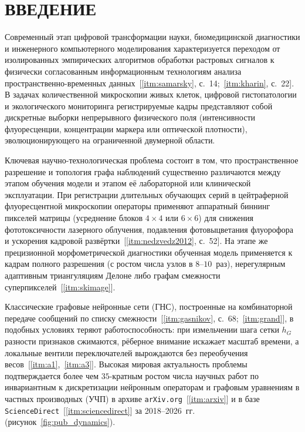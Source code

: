 
\chapter*{\large ВВЕДЕНИЕ}

Современный этап цифровой трансформации науки, биомедицинской диагностики и инженерного компьютерного моделирования характеризуется переходом от изолированных эмпирических алгоритмов обработки растровых сигналов к физически согласованным информационным технологиям анализа пространственно-временных данных~[\ref{itm:samarsky}, с.~14;~\ref{itm:kharin}, с.~22]. В задачах количественной микроскопии живых клеток, цифровой гистопатологии и экологического мониторинга регистрируемые кадры представляют собой дискретные выборки непрерывного физического поля (интенсивности флуоресценции, концентрации маркера или оптической плотности), эволюционирующего на ограниченной двумерной области.

Ключевая научно-технологическая проблема состоит в том, что пространственное разрешение и топология графа наблюдений существенно различаются между этапом обучения модели и этапом её лабораторной или клинической эксплуатации. При регистрации длительных обучающих серий в цейтраферной флуоресцентной микроскопии операторы применяют аппаратный биннинг пикселей матрицы (усреднение блоков $4\times 4$ или $6\times 6$) для снижения фототоксичности лазерного облучения, подавления фотовыцветания флуорофора и ускорения кадровой развёртки~[\ref{itm:nedzvedz2012}, с.~52]. На этапе же прецизионной морфометрической диагностики обученная модель применяется к кадрам полного разрешения (с ростом числа узлов в $8\text{--}10$~раз), нерегулярным адаптивным триангуляциям Делоне либо графам смежности суперпикселей~[\ref{itm:skimage}].

Классические графовые нейронные сети (ГНС), построенные на комбинаторной передаче сообщений по списку смежности~[\ref{itm:gasnikov}, с.~68;~\ref{itm:grand}], в подобных условиях теряют работоспособность: при измельчении шага сетки $h_G$ разности признаков сжимаются, рёберное внимание искажает масштаб времени, а локальные вентили переключателей вырождаются без переобучения весов~[\ref{itm:a1},~\ref{itm:a3}]. Высокая мировая актуальность проблемы подтверждается более чем $35$-кратным ростом числа научных работ по инвариантным к дискретизации нейронным операторам и графовым уравнениям в частных производных (УЧП) в архиве \texttt{arXiv.org}~[\ref{itm:arxiv}] и в базе \texttt{ScienceDirect}~[\ref{itm:sciencedirect}] за 2018--2026~гг. (рисунок~\ref{fig:pub_dynamics}).

